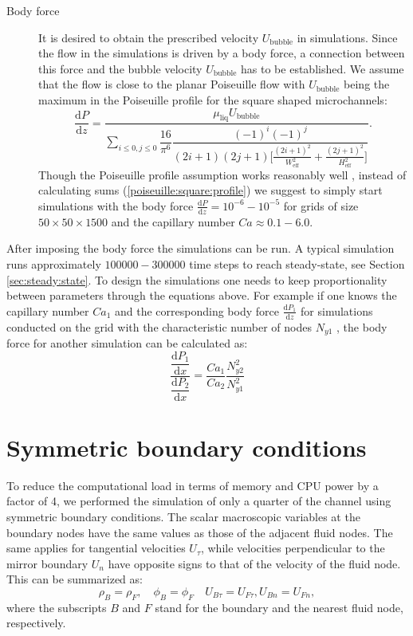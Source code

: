 \documentclass[preprint,12pt]{elsarticle}
\begin{document}
\begin{description}
\item[Body force] 
It is desired to obtain the prescribed velocity $U_{\mathrm{bubble}}$ in simulations. Since the
flow in the simulations is driven by a body force, a connection between this force and the
bubble velocity $U_{\mathrm{bubble}}$ has to be established. We assume that the
flow is close to the planar Poiseuille flow with $U_{\mathrm{bubble}}$ being the maximum in the
Poiseuille profile for the square shaped microchannels:
\begin{equation}
\label{poiseuille:square:profile}
\dfrac{\mathrm{d}P}{\mathrm{d}z}=\frac{\mu_{\mathrm{liq}} U_{\mathrm{bubble}}}{\sum_{i\leq 0,j\leq
0}{\dfrac{16}{\pi^6} \dfrac{(-1)^i (-1)^j}{(2 i+1)(2 j+1)\bigl[\frac{(2 i
+1)^2}{W_{\mathrm{eff}}^2}+\frac{(2 j+1)^2}{H_{\mathrm{eff}}^2}\bigr]}}}.
\end{equation}
Though the Poiseuille profile assumption works reasonably well \cite{kuzmin-binary2d}, instead of
calculating sums (\ref{poiseuille:square:profile}) we suggest to simply start simulations with the
body force $\frac{\mathrm{d}P}{\mathrm{d}z}=10^{-6}-10^{-5}$ for grids of size $50\times 50 \times
1500$ and the capillary number $Ca\approx0.1-6.0$.  
\end{description}
After imposing the body force the simulations can be run. A typical simulation runs approximately
$100000-300000$ time steps to reach steady-state, see Section \ref{sec:steady:state}. To design the
simulations one needs to keep proportionality between parameters through the equations above. For
example if one knows the capillary number $Ca_1$ and the corresponding body force
$\frac{\mathrm{d}P_1}{\mathrm{d}z}$ for simulations conducted on the grid with the characteristic
number of nodes $N_{y1}$ , the body force for another simulation can be calculated as:
\begin{equation}
\dfrac{\dfrac{\mathrm{d}P_1}{\mathrm{d}x}}{\dfrac{\mathrm{d}P_2}{\mathrm{d}x}}=\frac{Ca_1}{Ca_2}
\frac{N_{
y2}^2 }{N_{y1}^2}
\end{equation}

\section{Symmetric boundary conditions}
\label{append:sym}
To reduce the computational load in terms of memory and CPU power by a factor of 4, we performed the simulation of 
only a quarter of the channel using symmetric boundary conditions.  The scalar macroscopic variables
at the boundary nodes have the same values as those of the adjacent fluid nodes.  The same applies
for tangential velocities $U_{\tau}$, while velocities perpendicular  to the mirror boundary $U_n$ have opposite signs
to that of the velocity of the fluid node.  This can be summarized as:
\begin{equation}
\rho_B = \rho_F, \quad \phi_B = \phi_F \quad U_{B\tau}=U_{F\tau}, U_{B n}=U_{F n}, 
\end{equation}
where the subscripts $B$ and $F$ stand for the boundary and the nearest fluid node, respectively.
\end{document}
